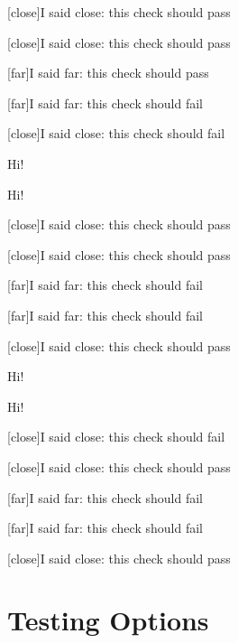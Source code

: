 \documentclass{book}
\begin{document}

[close]{I said close: this check should pass}

[close]{I said close: this check should pass}

[far]{I said far: this check should pass}

[far]{I said far: this check should fail}

[close]{I said close: this check should fail}

\clearpage{}

Hi!

\clearpage{}

Hi!

\clearpage{}


[close]{I said close: this check should pass}

[close]{I said close: this check should pass}

[far]{I said far: this check should fail}

[far]{I said far: this check should fail}

[close]{I said close: this check should pass}

\clearpage{}

Hi!

\clearpage{}

Hi!

\clearpage{}


[close]{I said close: this check should fail}

[close]{I said close: this check should pass}

[far]{I said far: this check should fail}

[far]{I said far: this check should fail}

[close]{I said close: this check should pass}

\part{Testing Options}
\end{document}
